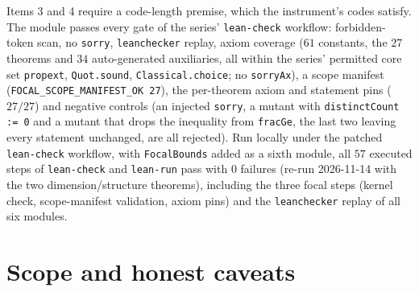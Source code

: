 \documentclass[11pt,a4paper]{article}
\theoremstyle{plain}
\theoremstyle{remark}
\begin{document}
Items 3 and 4 require a code-length premise, which the instrument's codes satisfy. The module passes every gate of the series' \texttt{lean-check} workflow: forbidden-token scan, no \texttt{sorry}, \texttt{leanchecker} replay, axiom coverage ($61$ constants, the $27$ theorems and $34$ auto-generated auxiliaries, all within the series' permitted core set \texttt{propext}, \texttt{Quot.sound}, \texttt{Classical.choice}; no \texttt{sorryAx}), a scope manifest (\texttt{FOCAL\_SCOPE\_MANIFEST\_OK 27}), the per-theorem axiom and statement pins ($27/27$) and negative controls (an injected \texttt{sorry}, a mutant with \texttt{distinctCount := 0} and a mutant that drops the inequality from \texttt{fracGe}, the last two leaving every statement unchanged, are all rejected). Run locally under the patched \texttt{lean-check} workflow, with \texttt{FocalBounds} added as a sixth module, all $57$ executed steps of \texttt{lean-check} and \texttt{lean-run} pass with $0$ failures (re-run 2026-11-14 with the two dimension/structure theorems), including the three focal steps (kernel check, scope-manifest validation, axiom pins) and the \texttt{leanchecker} replay of all six modules.

\section{Scope and honest caveats}
\label{sec:scope}
\end{document}
